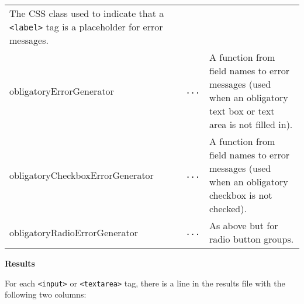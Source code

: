 \documentclass[
]{article}
\begin{document}
\begin{RaggedRight}
\begin{longtable}[]{p{1.7in}p{1in}p{3.15in}}
\begin{minipage}[t]{0.37\columnwidth}
The CSS class used to indicate that a
\texttt{\textless{}label\textgreater{}} tag is a placeholder for error
messages.\strut
\end{minipage}\tabularnewline
\begin{minipage}[t]{0.26\columnwidth}\raggedright
obligatoryErrorGenerator\strut
\end{minipage} & \begin{minipage}[t]{0.28\columnwidth}\raggedright
\texttt{...}\strut
\end{minipage} & \begin{minipage}[t]{0.37\columnwidth}\raggedright
A function from field names to error messages (used when an obligatory
text box or text area is not filled in).\strut
\end{minipage}\tabularnewline
\begin{minipage}[t]{0.26\columnwidth}\raggedright
obligatoryCheckboxErrorGenerator\strut
\end{minipage} & \begin{minipage}[t]{0.28\columnwidth}\raggedright
\texttt{...}\strut
\end{minipage} & \begin{minipage}[t]{0.37\columnwidth}\raggedright
A function from field names to error messages (used when an obligatory
checkbox is not checked).\strut
\end{minipage}\tabularnewline
\begin{minipage}[t]{0.26\columnwidth}\raggedright
obligatoryRadioErrorGenerator\strut
\end{minipage} & \begin{minipage}[t]{0.28\columnwidth}\raggedright
\texttt{...}\strut
\end{minipage} & \begin{minipage}[t]{0.37\columnwidth}\raggedright
As above but for radio button groups.\strut
\end{minipage}\tabularnewline
\bottomrule
\end{longtable}\normalsize\end{RaggedRight}

\textbf{Results}

For each \texttt{\textless{}input\textgreater{}} or
\texttt{\textless{}textarea\textgreater{}} tag, there is a line in the
results file with the following two columns:
\end{document}
